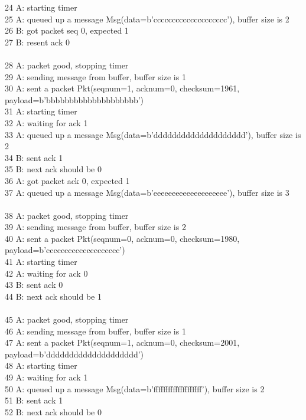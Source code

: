 \documentclass{article}
\begin{document}
{24 A: starting timer\\
25 A: queued up a message Msg(data=b'cccccccccccccccccccc'), buffer size is 2\\
26 B: got packet seq 0, expected 1\\
27 B: resent  ack 0\\
\\
28 A: packet good, stopping timer\\
29 A: sending message from buffer, buffer size is 1\\
30 A: sent a packet Pkt(seqnum=1, acknum=0, checksum=1961, payload=b'bbbbbbbbbbbbbbbbbbbb')\\
31 A: starting timer\\
32 A: waiting for ack 1\\
33 A: queued up a message Msg(data=b'dddddddddddddddddddd'), buffer size is 2\\
34 B: sent ack 1\\
35 B: next ack should be 0\\
36 A: got packet ack 0, expected 1\\
37 A: queued up a message Msg(data=b'eeeeeeeeeeeeeeeeeeee'), buffer size is 3\\
\\
38 A: packet good, stopping timer\\
39 A: sending message from buffer, buffer size is 2\\
40 A: sent a packet Pkt(seqnum=0, acknum=0, checksum=1980, payload=b'cccccccccccccccccccc')\\
41 A: starting timer\\
42 A: waiting for ack 0\\
43 B: sent ack 0\\
44 B: next ack should be 1\\
\\
45 A: packet good, stopping timer\\
46 A: sending message from buffer, buffer size is 1\\
47 A: sent a packet Pkt(seqnum=1, acknum=0, checksum=2001, payload=b'dddddddddddddddddddd')\\
48 A: starting timer\\
49 A: waiting for ack 1\\
50 A: queued up a message Msg(data=b'ffffffffffffffffffff'), buffer size is 2\\
51 B: sent ack 1\\
52 B: next ack should be 0\\
}
\end{document}
